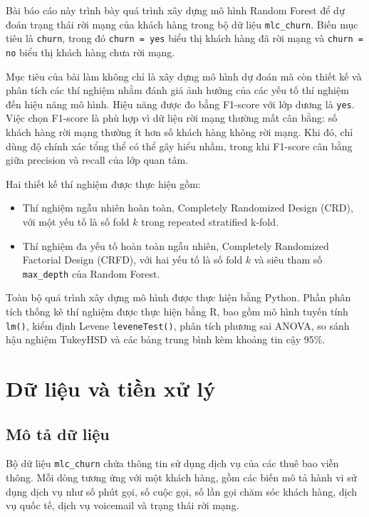 \documentclass[12pt,a4paper]{article}
\begin{document}
Bài báo cáo này trình bày quá trình xây dựng mô hình Random Forest để dự đoán trạng thái rời mạng của khách hàng trong bộ dữ liệu \texttt{mlc\_churn}. Biến mục tiêu là \texttt{churn}, trong đó \texttt{churn = yes} biểu thị khách hàng đã rời mạng và \texttt{churn = no} biểu thị khách hàng chưa rời mạng.

Mục tiêu của bài làm không chỉ là xây dựng mô hình dự đoán mà còn thiết kế và phân tích các thí nghiệm nhằm đánh giá ảnh hưởng của các yếu tố thí nghiệm đến hiệu năng mô hình. Hiệu năng được đo bằng F1-score với lớp dương là \texttt{yes}. Việc chọn F1-score là phù hợp vì dữ liệu rời mạng thường mất cân bằng: số khách hàng rời mạng thường ít hơn số khách hàng không rời mạng. Khi đó, chỉ dùng độ chính xác tổng thể có thể gây hiểu nhầm, trong khi F1-score cân bằng giữa precision và recall của lớp quan tâm.

Hai thiết kế thí nghiệm được thực hiện gồm:
\begin{itemize}
    \item Thí nghiệm ngẫu nhiên hoàn toàn, Completely Randomized Design (CRD), với một yếu tố là số fold $k$ trong repeated stratified k-fold.
    \item Thí nghiệm đa yếu tố hoàn toàn ngẫu nhiên, Completely Randomized Factorial Design (CRFD), với hai yếu tố là số fold $k$ và siêu tham số \texttt{max\_depth} của Random Forest.
\end{itemize}

Toàn bộ quá trình xây dựng mô hình được thực hiện bằng Python. Phần phân tích thống kê thí nghiệm được thực hiện bằng R, bao gồm mô hình tuyến tính \texttt{lm()}, kiểm định Levene \texttt{leveneTest()}, phân tích phương sai ANOVA, so sánh hậu nghiệm TukeyHSD và các bảng trung bình kèm khoảng tin cậy 95\%.

\section{Dữ liệu và tiền xử lý}

\subsection{Mô tả dữ liệu}

Bộ dữ liệu \texttt{mlc\_churn} chứa thông tin sử dụng dịch vụ của các thuê bao viễn thông. Mỗi dòng tương ứng với một khách hàng, gồm các biến mô tả hành vi sử dụng dịch vụ như số phút gọi, số cuộc gọi, số lần gọi chăm sóc khách hàng, dịch vụ quốc tế, dịch vụ voicemail và trạng thái rời mạng.
\end{document}
